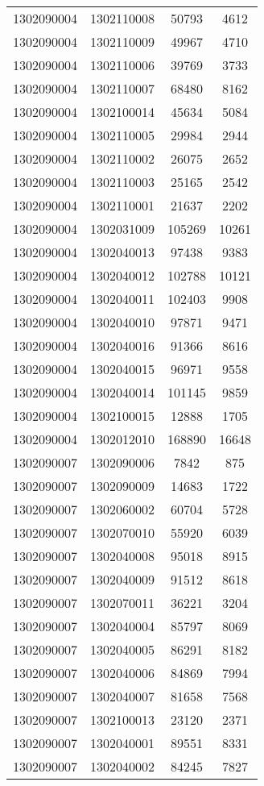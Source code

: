 \begin{longtable}{llcc}
1302090004 & 1302110008 & 50793 & 4612\\
1302090004 & 1302110009 & 49967 & 4710\\
1302090004 & 1302110006 & 39769 & 3733\\
1302090004 & 1302110007 & 68480 & 8162\\
1302090004 & 1302100014 & 45634 & 5084\\
1302090004 & 1302110005 & 29984 & 2944\\
1302090004 & 1302110002 & 26075 & 2652\\
1302090004 & 1302110003 & 25165 & 2542\\
1302090004 & 1302110001 & 21637 & 2202\\
1302090004 & 1302031009 & 105269 & 10261\\
1302090004 & 1302040013 & 97438 & 9383\\
1302090004 & 1302040012 & 102788 & 10121\\
1302090004 & 1302040011 & 102403 & 9908\\
1302090004 & 1302040010 & 97871 & 9471\\
1302090004 & 1302040016 & 91366 & 8616\\
1302090004 & 1302040015 & 96971 & 9558\\
1302090004 & 1302040014 & 101145 & 9859\\
1302090004 & 1302100015 & 12888 & 1705\\
1302090004 & 1302012010 & 168890 & 16648\\
1302090007 & 1302090006 & 7842 & 875\\
1302090007 & 1302090009 & 14683 & 1722\\
1302090007 & 1302060002 & 60704 & 5728\\
1302090007 & 1302070010 & 55920 & 6039\\
1302090007 & 1302040008 & 95018 & 8915\\
1302090007 & 1302040009 & 91512 & 8618\\
1302090007 & 1302070011 & 36221 & 3204\\
1302090007 & 1302040004 & 85797 & 8069\\
1302090007 & 1302040005 & 86291 & 8182\\
1302090007 & 1302040006 & 84869 & 7994\\
1302090007 & 1302040007 & 81658 & 7568\\
1302090007 & 1302100013 & 23120 & 2371\\
1302090007 & 1302040001 & 89551 & 8331\\
1302090007 & 1302040002 & 84245 & 7827\\

\end{longtable}
